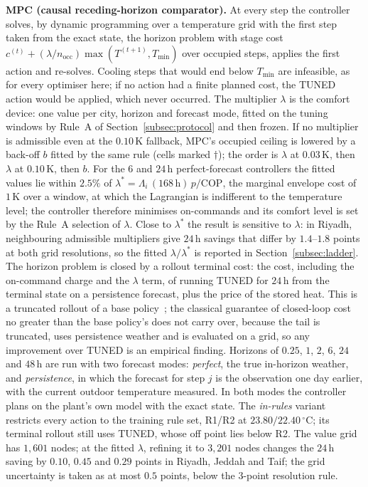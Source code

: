 \documentclass[3p,twocolumn,number]{elsarticle}
\newcommand{\Tmin}{T_{\min}}
\begin{document}
\textbf{MPC (causal receding-horizon comparator).} At every step the controller solves, by dynamic programming over a temperature grid with the first step taken from the exact state, the horizon problem with stage cost $c^{(t)}+(\lambda/n_{\mathrm{occ}})\max(T^{(t+1)},\Tmin)$ over occupied steps, applies the first action and re-solves. Cooling steps that would end below $\Tmin$ are infeasible, as for every optimiser here; if no action had a finite planned cost, the TUNED action would be applied, which never occurred. The multiplier $\lambda$ is the comfort device: one value per city, horizon and forecast mode, fitted on the tuning windows by Rule~A of Section~\ref{subsec:protocol} and then frozen. If no multiplier is admissible even at the $0.10\,$K fallback, MPC's occupied ceiling is lowered by a back-off $b$ fitted by the same rule (cells marked $\dagger$); the order is $\lambda$ at $0.03\,$K, then $\lambda$ at $0.10\,$K, then $b$. For the $6$ and $24\,$h perfect-forecast controllers the fitted values lie within $2.5\%$ of $\lambda^\ast=\Lambda_i\,(168\,\mathrm{h})\,p/\mathrm{COP}$, the marginal envelope cost of $1\,$K over a window, at which the Lagrangian is indifferent to the temperature level; the controller therefore minimises on-commands and its comfort level is set by the Rule~A selection of $\lambda$. Close to $\lambda^\ast$ the result is sensitive to $\lambda$: in Riyadh, neighbouring admissible multipliers give $24\,$h savings that differ by $1.4$--$1.8$ points at both grid resolutions, so the fitted $\lambda/\lambda^\ast$ is reported in Section~\ref{subsec:ladder}. The horizon problem is closed by a rollout terminal cost: the cost, including the on-command charge and the $\lambda$ term, of running TUNED for $24\,$h from the terminal state on a persistence forecast, plus the price of the stored heat. This is a truncated rollout of a base policy~\cite{Bertsekas2020}; the classical guarantee of closed-loop cost no greater than the base policy's does not carry over, because the tail is truncated, uses persistence weather and is evaluated on a grid, so any improvement over TUNED is an empirical finding. Horizons of $0.25$, $1$, $2$, $6$, $24$ and $48\,$h are run with two forecast modes: \emph{perfect}, the true in-horizon weather, and \emph{persistence}, in which the forecast for step $j$ is the observation one day earlier, with the current outdoor temperature measured. In both modes the controller plans on the plant's own model with the exact state. The \emph{in-rules} variant restricts every action to the training rule set, R1/R2 at $23.80/22.40\,^\circ$C; its terminal rollout still uses TUNED, whose off point lies below R2. The value grid has $1{,}601$ nodes; at the fitted $\lambda$, refining it to $3{,}201$ nodes changes the $24\,$h saving by $0.10$, $0.45$ and $0.29$ points in Riyadh, Jeddah and Taif; the grid uncertainty is taken as at most $0.5$ points, below the $3$-point resolution rule.
\end{document}
